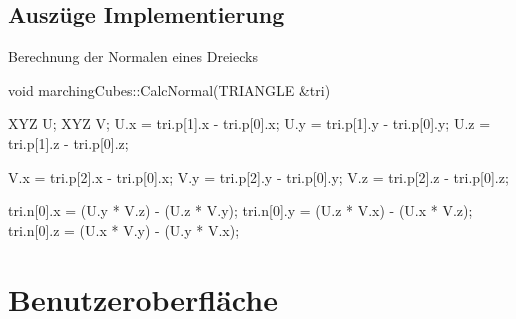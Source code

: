 \subsection{Auszüge Implementierung}
\begin{program}
	\caption{Berechnung der Normalen eines Dreiecks}
	\label{prog:calcNormal}
\begin{CCode}
	void marchingCubes::CalcNormal(TRIANGLE &tri){
		XYZ U;
		XYZ V;
		U.x = tri.p[1].x - tri.p[0].x;
		U.y = tri.p[1].y - tri.p[0].y;
		U.z = tri.p[1].z - tri.p[0].z;
		
		V.x = tri.p[2].x - tri.p[0].x;
		V.y = tri.p[2].y - tri.p[0].y;
		V.z = tri.p[2].z - tri.p[0].z;
		
		tri.n[0].x = (U.y * V.z) - (U.z * V.y);
		tri.n[0].y = (U.z * V.x) - (U.x * V.z);
		tri.n[0].z = (U.x * V.y) - (U.y * V.x);
	}
\end{CCode}
\end{program}

\section{Benutzeroberfläche}